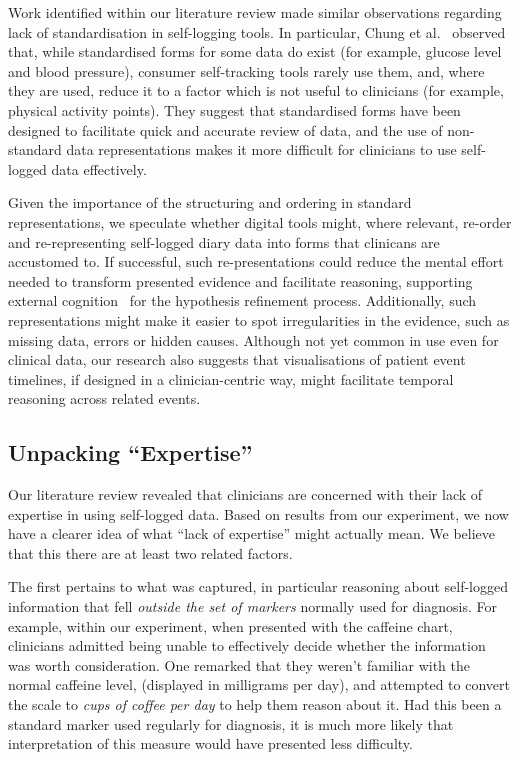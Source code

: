 \documentclass{sigchi}
\begin{document}
Work identified within our literature review made similar observations regarding lack of standardisation in self-logging tools. In particular, Chung et al.\ \cite{chung_more_2015} observed that, while standardised forms for some data do exist (for example, glucose level and blood pressure), consumer self-tracking tools rarely use them, and, where they are used, reduce it to a factor which is not useful to clinicians (for example, physical activity points). They suggest that standardised forms have been designed to facilitate quick and accurate review of data, and the use of non-standard data representations makes it more difficult for clinicians to use self-logged data effectively.

Given the importance of the structuring and ordering in standard representations, we speculate whether digital tools might, where relevant, re-order and re-representing self-logged diary data into forms that clinicans are accustomed to.  If successful, such re-presentations could reduce the mental effort needed to transform presented evidence and facilitate reasoning, supporting external cognition~\cite{extcog} for the hypothesis refinement process.  Additionally, such representations might make it easier to spot irregularities in the evidence, such as missing data, errors or hidden causes.  Although not yet common in use even for clinical data, our research also suggests that visualisations of patient event timelines, if designed in a clinician-centric way, might facilitate temporal reasoning across related events.

\subsection{Unpacking ``Expertise''}

Our literature review revealed that clinicians are concerned with their lack of expertise in using self-logged data. Based on results from our experiment, we now have a clearer idea of what ``lack of expertise'' might actually mean.  We believe that this there are at least two related factors.

The first pertains to what was captured, in particular reasoning about self-logged information that fell \emph{outside the set of markers} normally used for diagnosis.  For example, within our experiment, when presented with the caffeine chart, clinicians admitted being unable to effectively decide whether the information was worth consideration.  One remarked that they weren't familiar with the normal caffeine level, (displayed in milligrams per day), and attempted to convert the scale to \emph{cups of coffee per day} to help them reason about it.  Had this been a standard marker used regularly for diagnosis, it is much more likely that interpretation of this measure would have presented less difficulty.
\end{document}

